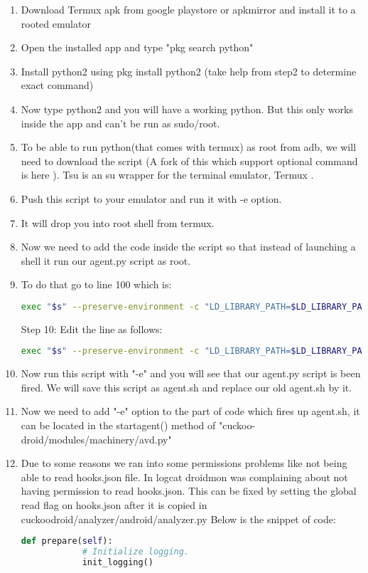 \documentclass[../main.tex]{subfile}
\begin{document}
		\begin{enumerate}
		\item Download Termux apk from google playstore or apkmirror and install it to a rooted emulator
		\item Open the installed app and type "pkg search python"
		\item Install python2 using pkg install python2 (take help from step2 to determine exact command)
		\item Now type python2 and you will have a working python. But this only works inside the app and can't be run as sudo/root.
		\item To be able to run python(that comes with termux) as root from adb, we will need to download the script \cite{tsu_cswl}  (A fork of this which support optional command is here \cite{tsu_kiney}). Tsu is an su wrapper for the terminal emulator, Termux \cite{termux_website}.
		\item Push this script to your emulator and run it with -e option.
		\item It will drop you into root shell from termux.
		\item Now we need to add the code inside the script so that instead of launching a shell it run our agent.py script as root.
		\item To do that go to line 100 which is:
		\begin{lstlisting}[language=bash, numbers=none]
		exec "$s" --preserve-environment -c "LD_LIBRARY_PATH=$LD_LIBRARY_PATH $ROOT_SHELL" 
		\end{lstlisting}
		Step 10: Edit the line as follows:
		\begin{lstlisting}[language=bash, numbers=none]
		exec "$s" --preserve-environment -c "LD_LIBRARY_PATH=$LD_LIBRARY_PATH python2 /data/local/agent.py" 
		\end{lstlisting}
		
		\item Now run this script with "-e" and you will see that our agent.py script is been fired. We will save this script as agent.sh and replace our old agent.sh by it.
		\item Now we need to add "-e" option to the part of code which fires up agent.sh, it can be located in the start\textunderscore agent() method of "cuckoo-droid/modules/machinery/avd.py"
		\item Due to some reasons we ran into some permissions problems like not being able to read hooks.json file. In logcat droidmon was complaining about not having permission to read hooks.json. This can be fixed by setting the global read flag on hooks.json after it is copied in cuckoodroid/analyzer/android/analyzer.py Below is the snippet of code:
		\begin{lstlisting}[language=python]
		def prepare(self):
			# Initialize logging.
			init_logging()
			

\end{lstlisting}
\end{enumerate}
\end{document}
